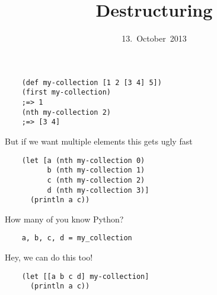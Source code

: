

\title{Destructuring}
\date{13.~October~2013}



\frame{\titlepage}




\begin{frame}[fragile]
  \begin{verbatim}
    (def my-collection [1 2 [3 4] 5])
    (first my-collection)
    ;=> 1
    (nth my-collection 2)
    ;=> [3 4]
  \end{verbatim}
\end{frame}

\begin{frame}[fragile]
  \begin{center}
    But if we want multiple elements this gets ugly fast
  \end{center}
  \begin{verbatim}
    (let [a (nth my-collection 0)
          b (nth my-collection 1)
          c (nth my-collection 2)
          d (nth my-collection 3)]
      (println a c))
  \end{verbatim}
\end{frame}

\begin{frame}[fragile]
  \begin{center}
    How many of you know Python?
  \end{center}
  \pause
  \begin{verbatim}
    a, b, c, d = my_collection
  \end{verbatim}
\end{frame}


\begin{frame}[fragile]
  \begin{center}
    Hey, we can do this too!
  \end{center}
  \begin{verbatim}
    (let [[a b c d] my-collection]
      (println a c))
  \end{verbatim}
\end{frame}


